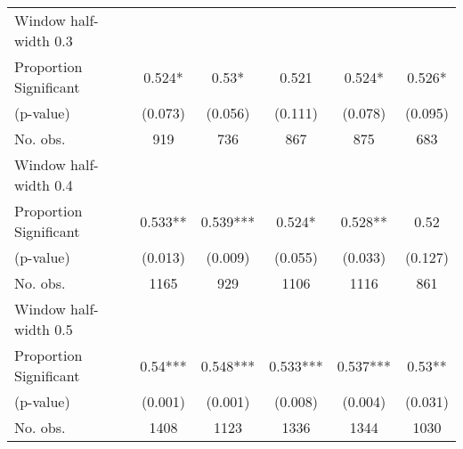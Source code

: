 \begin{tabular}{l*{5}{c}}
\hline
Window half-width 0.3\\

Proportion Significant& 0.524* &  0.53* &  0.521 &  0.524* &  0.526*\\

(p-value) & (0.073) &  (0.056) &  (0.111) &  (0.078) &  (0.095)\\

No. obs.& 919 &  736 &  867 &  875 &  683\\

\hline
Window half-width 0.4\\

Proportion Significant& 0.533** &  0.539*** &  0.524* &  0.528** &  0.52\\

(p-value) & (0.013) &  (0.009) &  (0.055) &  (0.033) &  (0.127)\\

No. obs.& 1165 &  929 &  1106 &  1116 &  861\\

\hline
Window half-width 0.5\\

Proportion Significant& 0.54*** &  0.548*** &  0.533*** &  0.537*** &  0.53**\\

(p-value) & (0.001) &  (0.001) &  (0.008) &  (0.004) &  (0.031)\\

No. obs.& 1408 &  1123 &  1336 &  1344 &  1030\\

\hline\hline
\end{tabular}

